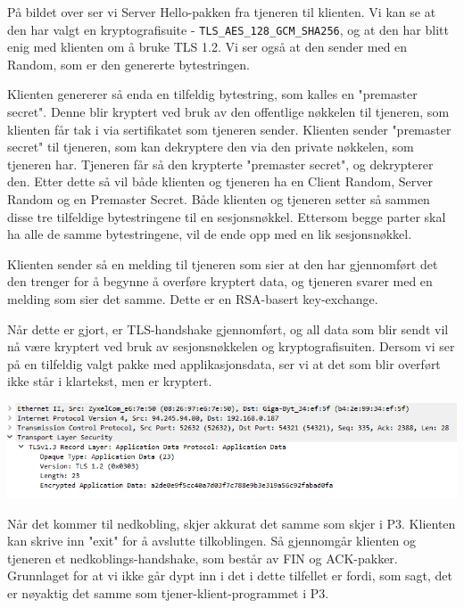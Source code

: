 \documentclass[12pt]{article}
\begin{document}
    På bildet over ser vi Server Hello-pakken fra tjeneren til klienten.
    Vi kan se at den har valgt en kryptografisuite - \verb|TLS_AES_128_GCM_SHA256|,
    og at den har blitt enig med klienten om å bruke TLS 1.2. Vi ser også at den sender med
    en Random, som er den genererte bytestringen.

    Klienten genererer så enda en tilfeldig bytestring, som kalles en "premaster secret". Denne 
    blir kryptert ved bruk av den offentlige nøkkelen til tjeneren, som klienten får tak i via 
    sertifikatet som tjeneren sender. Klienten sender "premaster secret" til tjeneren, som kan 
    dekryptere den via den private nøkkelen, som tjeneren har. Tjeneren får så den krypterte 
    "premaster secret", og dekrypterer den. Etter dette så vil både klienten og tjeneren ha 
    en Client Random, Server Random og en Premaster Secret. Både klienten og tjeneren setter så 
    sammen disse tre tilfeldige bytestringene til en sesjonsnøkkel. Ettersom begge parter skal 
    ha alle de samme bytestringene, vil de ende opp med en lik sesjonsnøkkel.

    Klienten sender så en melding til tjeneren som sier at den har gjennomført det den 
    trenger for å begynne å overføre kryptert data, og tjeneren svarer med en melding som 
    sier det samme. Dette er en RSA-basert key-exchange.

    Når dette er gjort, er TLS-handshake gjennomført, og all data som blir sendt 
    vil nå være kryptert ved bruk av sesjonsnøkkelen og kryptografisuiten.
    Dersom vi ser på en tilfeldig valgt pakke med applikasjonsdata, ser vi 
    at det som blir overført ikke står i klartekst, men er kryptert. 

    \begin{center}
        \includegraphics[width=\linewidth]{assets/81GWoEt.png}
    \end{center}

    Når det kommer til nedkobling, skjer akkurat det samme som skjer i 
    P3. Klienten kan skrive inn "exit" for å avslutte tilkoblingen. 
    Så gjennomgår klienten og tjeneren et nedkoblings-handshake, som 
    består av FIN og ACK-pakker. Grunnlaget for at vi ikke går dypt inn 
    i det i dette tilfellet er fordi, som sagt, det er nøyaktig det samme 
    som tjener-klient-programmet i P3.
\end{document}
